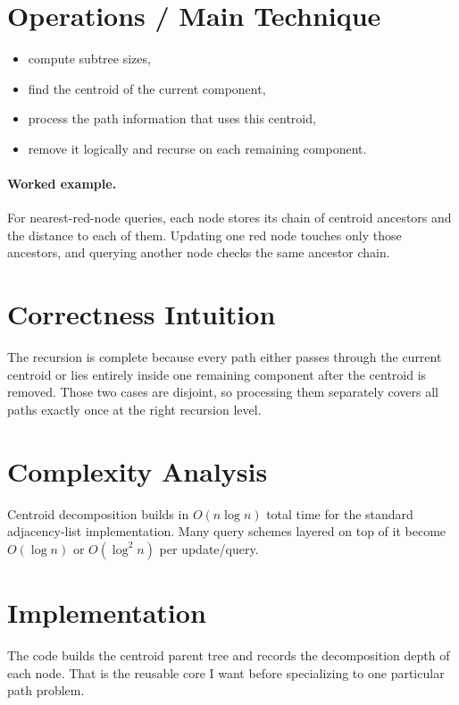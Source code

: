 \section*{Operations / Main Technique}

\begin{itemize}
  \item compute subtree sizes,
  \item find the centroid of the current component,
  \item process the path information that uses this centroid,
  \item remove it logically and recurse on each remaining component.
\end{itemize}

\paragraph{Worked example.}
For nearest-red-node queries, each node stores its chain of centroid ancestors and the distance to each of them. Updating
one red node touches only those ancestors, and querying another node checks the same ancestor chain.

\section*{Correctness Intuition}

The recursion is complete because every path either passes through the current centroid or lies entirely inside one
remaining component after the centroid is removed. Those two cases are disjoint, so processing them separately covers
all paths exactly once at the right recursion level.

\section*{Complexity Analysis}

Centroid decomposition builds in \(O(n \log n)\) total time for the standard adjacency-list implementation. Many query
schemes layered on top of it become \(O(\log n)\) or \(O(\log^2 n)\) per update/query.

\section*{Implementation}

The code builds the centroid parent tree and records the decomposition depth of each node. That is the reusable core I
want before specializing to one particular path problem.


